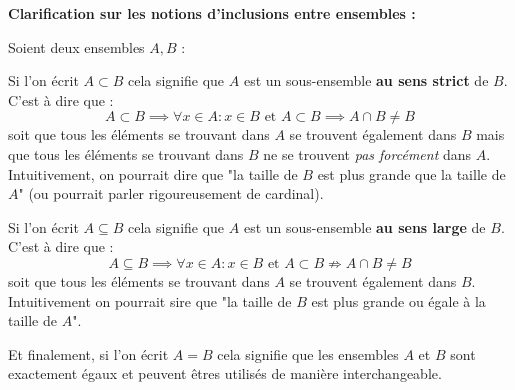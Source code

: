 \begin{myexem}
\textbf{Clarification sur les notions d'inclusions entre ensembles :}

\vspace{0.3cm}


\noindent Soient deux ensembles $A, B$ :

\vspace{0.3cm}

\noindent Si l'on écrit $ A \subset B $ cela signifie que $A$ est un sous-ensemble \textbf{au sens strict} de $B$. C'est à dire que : $$ A \subset B \implies \forall x \in A : x \in B \text{ et } A \subset B \implies A \cap B \ne B$$ soit que tous les éléments se trouvant dans $A$ se trouvent également dans $B$ mais que tous les éléments se trouvant dans $B$ ne se trouvent \emph{pas forcément} dans $A$. Intuitivement, on pourrait dire que "la taille de $B$ est plus grande que la taille de $A$" (ou pourrait parler rigoureusement de cardinal).

\vspace{0.3cm}

\noindent Si l'on écrit $ A \subseteq B $ cela signifie que $A$ est un sous-ensemble \textbf{au sens large} de $B$. C'est à dire que : $$ A \subseteq B \implies \forall x \in A : x \in B \text{ et } A \subset B \nRightarrow  A \cap B \ne B$$ soit que tous les éléments se trouvant dans $A$ se trouvent également dans $B$. Intuitivement on pourrait sire que "la taille de $B$ est plus grande ou égale à la taille de $A$".

\vspace{0.3cm}

\noindent Et finalement, si l'on écrit  $ A = B $ cela signifie que les ensembles $A$ et $B$ sont exactement égaux et peuvent êtres utilisés de manière interchangeable.
\newpage

\end{myexem}
